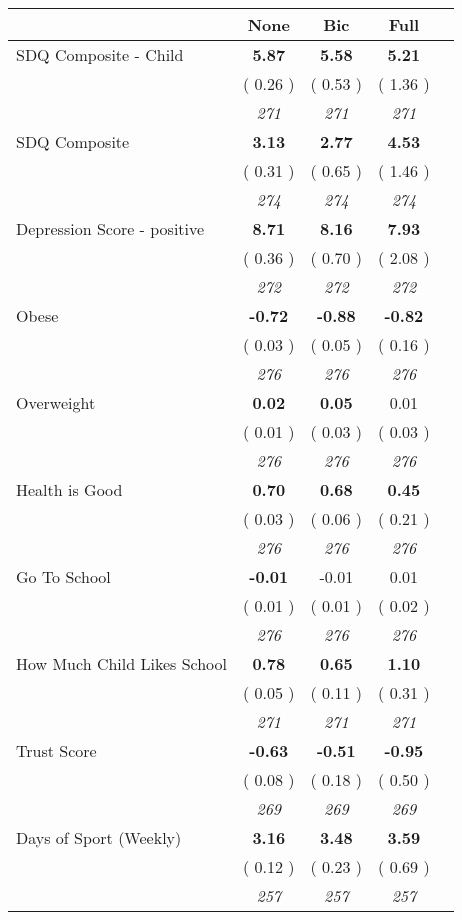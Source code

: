 \begin{tabular}{l c c c c}
\toprule
 & None & Bic & Full \\
\midrule
SDQ Composite - Child & \textbf{      5.87 } & \textbf{      5.58 } & \textbf{      5.21 } \\
& (     0.26 ) & (     0.53 ) & (     1.36 ) \\
& \textit{ 271 } & \textit{ 271 } & \textit{ 271 } \\
SDQ Composite & \textbf{      3.13 } & \textbf{      2.77 } & \textbf{      4.53 } \\
& (     0.31 ) & (     0.65 ) & (     1.46 ) \\
& \textit{ 274 } & \textit{ 274 } & \textit{ 274 } \\
Depression Score - positive & \textbf{      8.71 } & \textbf{      8.16 } & \textbf{      7.93 } \\
& (     0.36 ) & (     0.70 ) & (     2.08 ) \\
& \textit{ 272 } & \textit{ 272 } & \textit{ 272 } \\
Obese & \textbf{     -0.72 } & \textbf{     -0.88 } & \textbf{     -0.82 } \\
& (     0.03 ) & (     0.05 ) & (     0.16 ) \\
& \textit{ 276 } & \textit{ 276 } & \textit{ 276 } \\
Overweight & \textbf{      0.02 } & \textbf{      0.05 } &      0.01 \\
& (     0.01 ) & (     0.03 ) & (     0.03 ) \\
& \textit{ 276 } & \textit{ 276 } & \textit{ 276 } \\
Health is Good & \textbf{      0.70 } & \textbf{      0.68 } & \textbf{      0.45 } \\
& (     0.03 ) & (     0.06 ) & (     0.21 ) \\
& \textit{ 276 } & \textit{ 276 } & \textit{ 276 } \\
Go To School & \textbf{     -0.01 } &     -0.01 &      0.01 \\
& (     0.01 ) & (     0.01 ) & (     0.02 ) \\
& \textit{ 276 } & \textit{ 276 } & \textit{ 276 } \\
How Much Child Likes School & \textbf{      0.78 } & \textbf{      0.65 } & \textbf{      1.10 } \\
& (     0.05 ) & (     0.11 ) & (     0.31 ) \\
& \textit{ 271 } & \textit{ 271 } & \textit{ 271 } \\
Trust Score & \textbf{     -0.63 } & \textbf{     -0.51 } & \textbf{     -0.95 } \\
& (     0.08 ) & (     0.18 ) & (     0.50 ) \\
& \textit{ 269 } & \textit{ 269 } & \textit{ 269 } \\
Days of Sport (Weekly) & \textbf{      3.16 } & \textbf{      3.48 } & \textbf{      3.59 } \\
& (     0.12 ) & (     0.23 ) & (     0.69 ) \\
& \textit{ 257 } & \textit{ 257 } & \textit{ 257 } \\
\bottomrule
\end{tabular}
